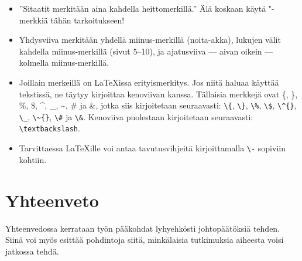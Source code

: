 \documentclass[utf8,bachelor,manualbib]{gradu3}
\begin{document}
\begin{itemize}

\item ''Sitaatit merkitään aina kahdella heittomerkillä.'' Älä koskaan käytä
"{}-merkkiä tähän tarkoitukseen!

\item Yhdysviiva merkitään yhdellä miinus-merkillä (noita-akka), lukujen
välit kahdella miinus-merkillä (sivut 5--10), ja ajatusviiva --- aivan oikein
--- kolmella miinus-merkillä.

\item Joillain merkeillä on \LaTeX{}issa erityismerkitys. Jos niitä haluaa
käyttää tekstissä, ne täytyy kirjoittaa kenoviivan kanssa. Tällaisia merkkejä
ovat \{, \}, \%, \$, \^{}, \_, \~{}, \# ja \&, jotka siis kirjoitetaan
seuraavasti: \texttt{\textbackslash\{}, \texttt{\textbackslash\}},
\texttt{\textbackslash\%}, \texttt{\textbackslash\$},
\texttt{\textbackslash\^{}\{\}}, \texttt{\textbackslash\_},
\texttt{\textbackslash\~{}\{\}}, \texttt{\textbackslash\#} ja
\texttt{\textbackslash\&}. Kenoviiva puolestaan kirjoitetaan seuraavasti:
\texttt{\textbackslash textbackslash}.

\item Tarvittaessa \LaTeX{}ille voi antaa ta\-vu\-tus\-vih\-jei\-tä
kirjoittamalla \texttt{\textbackslash-} sopiviin kohtiin.

\end{itemize}

\chapter{Yhteenveto}

Yhteenvedossa kerrataan työn pääkohdat lyhyehkösti johtopäätöksiä tehden. Siinä voi myös esittää pohdintoja siitä, minkälaisia tutkimuksia aiheesta voisi jatkossa tehdä.

\end{document}
